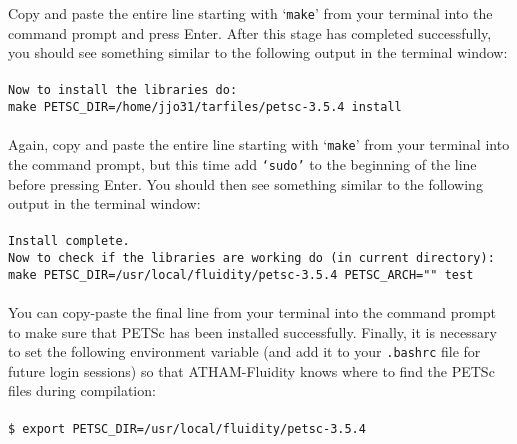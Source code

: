 \documentclass[10pt,a4paper]{article}
\newcommand\tab[1][0.5cm]{\hspace*{#1}}
\begin{document}
Copy and paste the entire line starting with `\texttt{make}' from your terminal into the command prompt and press Enter. After this stage has completed successfully, you should see something similar to the following output in the terminal window:\\\\
\tab \texttt{Now to install the libraries do:}\\
\tab \texttt{make PETSC\_DIR=/home/jjo31/tarfiles/petsc-3.5.4  install}\\\\
Again, copy and paste the entire line starting with `\texttt{make}' from your terminal into the command prompt, but this time add \texttt{`sudo'} to the beginning of the line before pressing Enter. You should then see something similar to the following output in the terminal window:\\\\
\tab \texttt{Install complete.}\\
\tab \texttt{Now to check if the libraries are working do (in current directory):}\\
\tab \texttt{make PETSC\_DIR=/usr/local/fluidity/petsc-3.5.4 PETSC\_ARCH="" test}\\\\
You can copy-paste the final line from your terminal into the command prompt to make sure that PETSc has been installed successfully. Finally, it is necessary to set the following environment variable (and add it to your \texttt{.bashrc} file for future login sessions) so that ATHAM-Fluidity knows where to find the PETSc files during compilation:\\\\
\tab \texttt{\$ export PETSC\_DIR=/usr/local/fluidity/petsc-3.5.4}
\end{document}
